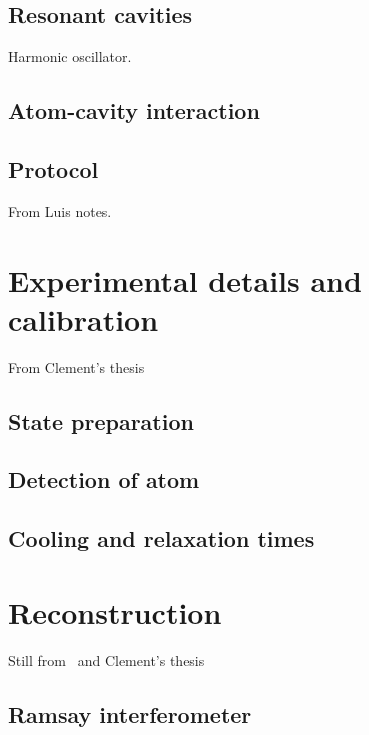 \documentclass[10pt]{report}
\theoremstyle{plain}
\theoremstyle{definition}
\theoremstyle{remark}
\begin{document}
\subsection{Resonant cavities}\label{ssec:rescav}

Harmonic oscillator.

\subsection{Atom-cavity interaction}

\subsection{Protocol}

From Luis notes.


\section{Experimental details and calibration}

From Clement's thesis

\subsection{State preparation}


\subsection{Detection of atom}


\subsection{Cooling and relaxation times}


\section{Reconstruction}

Still from~\cite{Har06} and Clement's thesis

\subsection{Ramsay interferometer}
\end{document}
